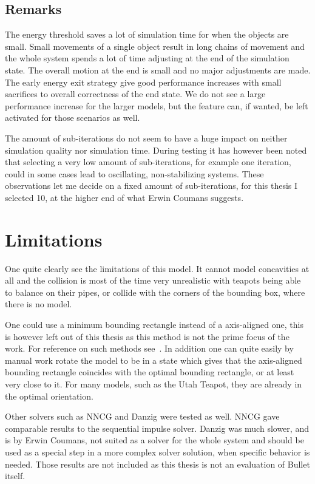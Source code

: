 \newpage
\subsection{Remarks}
The energy threshold saves a lot of simulation time for when the objects are small.
Small movements of a single object result in long chains of movement and the whole
system spends a lot of time adjusting at the end of the simulation state. The overall
motion at the end is small and no major adjustments are made. The early energy exit
strategy give good performance increases with small sacrifices to overall correctness
of the end state. We do not see a large performance increase for the larger models,
but the feature can, if wanted, be left activated for those scenarios as well.

The amount of sub-iterations do not seem to have a huge impact on neither simulation
quality nor simulation time.
During testing it has however been noted that selecting a very low amount of
sub-iterations, for example one iteration, could in some cases lead to oscillating,
 non-stabilizing systems. These observations let me decide on a fixed amount of sub-iterations, for
this thesis I selected 10, at the higher end of what Erwin Coumans suggests.

\section{Limitations}
One quite clearly see the limitations of this model. It cannot model concavities
at all and the collision is most of the time very unrealistic with teapots being
able to balance on their pipes, or collide with the corners of the bounding box,
where there is no model.

One could use a minimum bounding rectangle instead of a
axis-aligned one, this is however left out of this thesis as this method is not
the prime focus of the work. For reference on such methods see~\cite{minBounding}.
In addition one can quite easily by manual work rotate the model to be in a state
 which gives that the axis-aligned bounding
rectangle coincides with the optimal bounding rectangle, or at least very close
to it. For many models, such as the Utah Teapot, they are already in the optimal
orientation.

Other solvers such as NNCG and Danzig were tested as well. NNCG gave comparable
results to the sequential impulse solver. Danzig was much slower, and is by
Erwin Coumans, not suited as a solver for the whole system and should be used as
a special step in a more complex solver solution, when specific behavior is needed.
Those results are not included as this thesis is not an evaluation of Bullet itself.
